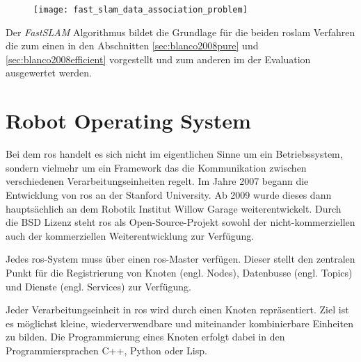 \begin{figure}
	\centering
	\texttt{[image: fast\_slam\_data\_association\_problem]}
	\label{fig:fast_slam_data_association_problemn}
\end{figure}

Der \textit{FastSLAM} Algorithmus bildet die Grundlage für die beiden \gls{roslam} Verfahren die zum einen in den Abschnitten \ref{sec:blanco2008pure} und \ref{sec:blanco2008efficient} vorgestellt und zum anderen im der Evaluation ausgewertet werden.


%
%


%
%
\section{Robot Operating System}

Bei dem \Gls{ros} handelt es sich nicht im eigentlichen Sinne um ein Betriebssystem, sondern vielmehr um ein Framework das die Kommunikation zwischen verschiedenen Verarbeitungseinheiten regelt. Im Jahre 2007 begann die Entwicklung von \Gls{ros} an der Stanford University. Ab 2009 wurde dieses dann hauptsächlich an dem Robotik Institut Willow Garage weiterentwickelt. Durch die BSD Lizenz steht \Gls{ros} als Open-Source-Projekt sowohl der nicht-kommerziellen auch der kommerziellen Weiterentwicklung zur Verfügung. \cite{quigley2009ros}

Jedes \Gls{ros}-System muss über einen \Gls{ros}-Master verfügen. Dieser stellt den zentralen Punkt für die Registrierung von Knoten (engl. Nodes), Datenbusse (engl. Topics) und Dienste (engl. Services) zur Verfügung.

Jeder Verarbeitungseinheit in \Gls{ros} wird durch einen Knoten repräsentiert. Ziel ist es möglichst kleine, wiederverwendbare und miteinander kombinierbare Einheiten zu bilden. Die Programmierung eines Knoten erfolgt dabei in den Programmiersprachen C++, Python oder Lisp.

